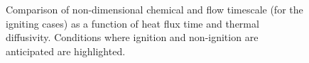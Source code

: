         \begin{figure}
            \centering
            \caption{Comparison of non-dimensional chemical and flow timescale (for the igniting cases) as a function of heat flux time and thermal diffusivity. Conditions where ignition and non-ignition are anticipated are highlighted.}
            \label{fig:nonDimPlot}
        \end{figure}
    
    
   
